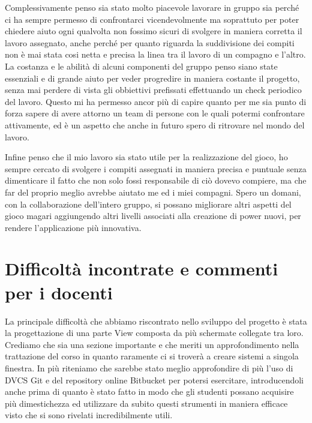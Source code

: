 \documentclass[a4paper,12pt]{report}
\begin{document}
Complessivamente penso sia stato molto piacevole lavorare in gruppo sia perché ci ha sempre permesso di confrontarci vicendevolmente ma soprattuto per poter chiedere aiuto ogni qualvolta non fossimo sicuri di svolgere in maniera corretta il lavoro assegnato, anche perché per quanto riguarda la suddivisione dei compiti non è mai stata cosi netta e precisa la linea tra il lavoro di un compagno e l'altro.
La costanza e le abilità di alcuni componenti del gruppo penso siano state essenziali e di grande aiuto per veder progredire in maniera costante il progetto, senza mai perdere di vista gli obbiettivi prefissati effettuando un check periodico del lavoro.
Questo mi ha permesso ancor più di capire quanto per me sia punto di forza sapere di avere attorno un team di persone con le quali potermi confrontare attivamente, ed è un aspetto che anche in futuro spero di ritrovare nel mondo del lavoro.

Infine penso che il mio lavoro sia stato utile per la realizzazione del gioco, ho sempre cercato di svolgere i compiti assegnati in maniera precisa e puntuale senza dimenticare il fatto che non solo fossi responsabile di ciò dovevo compiere, ma che far del proprio meglio avrebbe aiutato me ed i miei compagni.
Spero un domani, con la collaborazione dell'intero gruppo, si possano migliorare altri aspetti del gioco magari aggiungendo altri livelli associati alla creazione di power nuovi, per rendere l'applicazione più innovativa.

\section{Difficoltà incontrate e commenti per i docenti}
La principale difficoltà che abbiamo riscontrato nello sviluppo del progetto è stata la progettazione di una parte View composta da più schermate collegate tra loro. Crediamo che sia una sezione importante e che meriti un approfondimento nella trattazione del corso in quanto raramente ci si troverà a creare sistemi a singola finestra. 
In più riteniamo che sarebbe stato meglio approfondire di più l'uso di DVCS Git e del repository online Bitbucket per potersi esercitare, introducendoli anche prima di quanto è stato fatto in modo che gli studenti possano acquisire più dimestichezza ed utilizzare da subito questi strumenti in maniera efficace visto che si sono rivelati incredibilmente utili.
\end{document}
